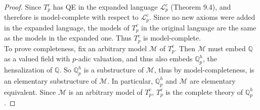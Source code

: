 \documentclass{article}
\begin{document}
  \begin{proof}
    Since $T_p^c$ has QE in the expanded language $\mathcal{L}_p^c$
    (Theorem 9.4), and therefore is model-complete with respect to
    $\mathcal{L}_p^c$. Since no new axioms were added in the expanded
    language, the models of $T_p^c$ in the original language are the same
    as the models in the expanded one. Thus $T_p^c$ is model-complete. \\

    To prove completeness, fix an arbitrary model $\mathcal{M}$ of $T_p^c$.
    Then $\mathcal{M}$ must embed $\mathbb{Q}$ as a valued field with
    $p$-adic valuation, and thus also embeds $\mathbb{Q}_p^h$, the
    hensalization of $\mathbb{Q}$. So $\mathbb{Q}_p^h$ is a substructure of
    $\mathcal{M}$, thus by model-completeness, is an elementary
    substructure of $\mathcal{M}$. In particular, $\mathbb{Q}_p^h$ and
    $\mathcal{M}$ are elementary equivalent.  Since $\mathcal{M}$ is an
    arbitrary model of $T_p^c$, $T_p^c$ is the complete theory of
    $\mathbb{Q}_p^h$.
  \end{proof}
\end{document}
